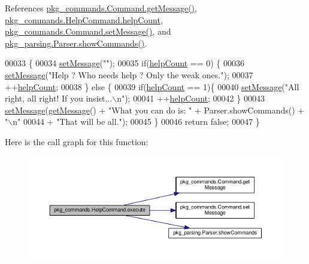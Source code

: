 References \hyperlink{Command_8java_source_l00097}{pkg\-\_\-commands.\-Command.\-get\-Message()}, \hyperlink{HelpCommand_8java_source_l00018}{pkg\-\_\-commands.\-Help\-Command.\-help\-Count}, \hyperlink{Command_8java_source_l00089}{pkg\-\_\-commands.\-Command.\-set\-Message()}, and \hyperlink{Parser_8java_source_l00059}{pkg\-\_\-parsing.\-Parser.\-show\-Commands()}.


\begin{DoxyCode}
00033                                           \{
00034         \hyperlink{classpkg__commands_1_1Command_ae210ff216fe908b111ba1c988a963d13}{setMessage}(\textcolor{stringliteral}{""});
00035         \textcolor{keywordflow}{if}(\hyperlink{classpkg__commands_1_1HelpCommand_a1f83dd0f92e63803f29ce29485903526}{helpCount} == 0) \{
00036             \hyperlink{classpkg__commands_1_1Command_ae210ff216fe908b111ba1c988a963d13}{setMessage}(\textcolor{stringliteral}{"Help ? Who needs help ? Only the weak ones."});
00037             ++\hyperlink{classpkg__commands_1_1HelpCommand_a1f83dd0f92e63803f29ce29485903526}{helpCount};
00038         \} \textcolor{keywordflow}{else} \{
00039             \textcolor{keywordflow}{if}(\hyperlink{classpkg__commands_1_1HelpCommand_a1f83dd0f92e63803f29ce29485903526}{helpCount} == 1)\{
00040                 \hyperlink{classpkg__commands_1_1Command_ae210ff216fe908b111ba1c988a963d13}{setMessage}(\textcolor{stringliteral}{"All right, all right! If you insist...\(\backslash\)n"});
00041                 ++\hyperlink{classpkg__commands_1_1HelpCommand_a1f83dd0f92e63803f29ce29485903526}{helpCount};
00042             \}
00043             \hyperlink{classpkg__commands_1_1Command_ae210ff216fe908b111ba1c988a963d13}{setMessage}(\hyperlink{classpkg__commands_1_1Command_ac2a42e2bab264821892daefaf9a18b6c}{getMessage}() + \textcolor{stringliteral}{"What you can do is: "} + Parser.showCommands() + \textcolor{stringliteral}{
      "\(\backslash\)n"}
00044                     + \textcolor{stringliteral}{"That will be all."});
00045         \}
00046         \textcolor{keywordflow}{return} \textcolor{keyword}{false};
00047     \}
\end{DoxyCode}


Here is the call graph for this function\-:\nopagebreak
\begin{figure}[H]
\begin{center}
\leavevmode
\includegraphics[width=350pt]{classpkg__commands_1_1HelpCommand_a332d3e57539dfc82f8c539f8b3e24dd6_cgraph}
\end{center}
\end{figure}




